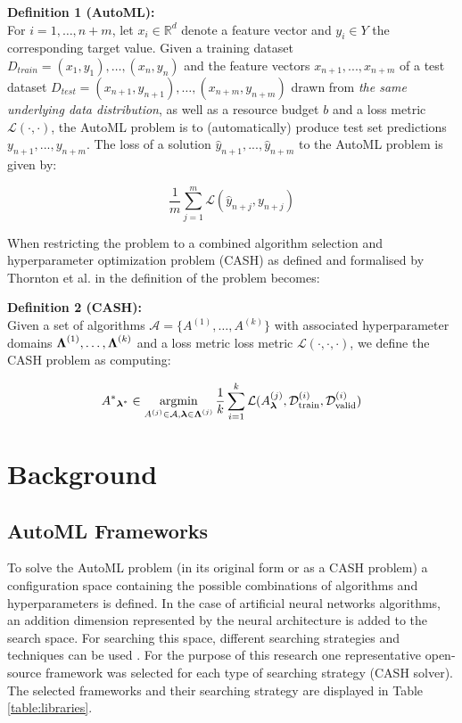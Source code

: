 \documentclass{sig-alternate-br}
\begin{document}
\textbf{Definition 1 (AutoML):} 
\\ For $i = 1, \dots , n + m$, let $x_i \in \mathbb{R}^d$ denote a feature vector and $y_i \in Y$ the corresponding target value. Given a training dataset $D_{train} = {(x_1, y_1),\dots , (x_{n}, y_{n})}$ and
the feature vectors $x_{n+1}, . . . , x_{n+m}$ of a test dataset $D_{test} = {(x_{n+1}, y_{n+1}), \dots ,(x_{n+m}, y_{n+m})}$
drawn from \textit{the same underlying data distribution}, as well as a resource budget $b$ and a loss metric
$\mathcal{L}(\cdot, \cdot)$, the AutoML problem is to (automatically) produce test set predictions $y_{n+1}, . . . , y_{n+m}$. The
loss of a solution $\hat{y}_{n+1}, . . . , \hat{y}_{n+m}$ to the AutoML problem is given by:

\begin{equation}
   \frac{1}{m} \sum_{j=1}^{m} \mathcal{L}( \hat{y}_{n+j},  {y}_{n+j})
\end{equation}

When restricting the problem to a combined algorithm selection and hyperparameter optimization problem (CASH) as defined and formalised by Thornton et al. in \cite{thornton2013autoweka} the definition of the problem becomes:

\textbf{Definition 2 (CASH):}
\\ Given a set of algorithms $\mathcal{A} = \{A^{(1)}, \dots, A^{(k)}\}$ with associated hyperparameter domains ${\boldsymbol{\Lambda}}^{(1)}, \dots, {\boldsymbol{\Lambda}}^{(k)}$ and a loss metric loss metric $\mathcal{L}(\cdot, \cdot, \cdot)$, we define the CASH problem as computing:

\begin{equation}
{A^*}_{\vlambda^*} \in \argmin_{A^{(j)} \in \mathcal{A}, \vlambda \in \vLambda^{(j)}} \frac{1}{k}  \sum_{i=1}^{k} \mathcal{L}(A^{(j)}_\vlambda, \mathcal{D}_{\text{train}}^{(i)}, \mathcal{D}_{\text{valid}}^{(i)})
\end{equation}

\section{Background}

\subsection{AutoML Frameworks}
To solve the AutoML problem (in its original form or as a CASH problem) a configuration space containing the possible combinations of algorithms and hyperparameters is defined. In the case of artificial neural networks algorithms, an addition dimension represented by the neural architecture is added to the search space. For searching this space, different searching strategies and techniques can be used \cite{truong2019towards}. For the purpose of this research one representative open-source framework \cite{gijsbers2019open} was selected for each type of searching strategy (CASH solver). The selected frameworks and their searching strategy are displayed in Table \ref{table:libraries}.
\end{document}
